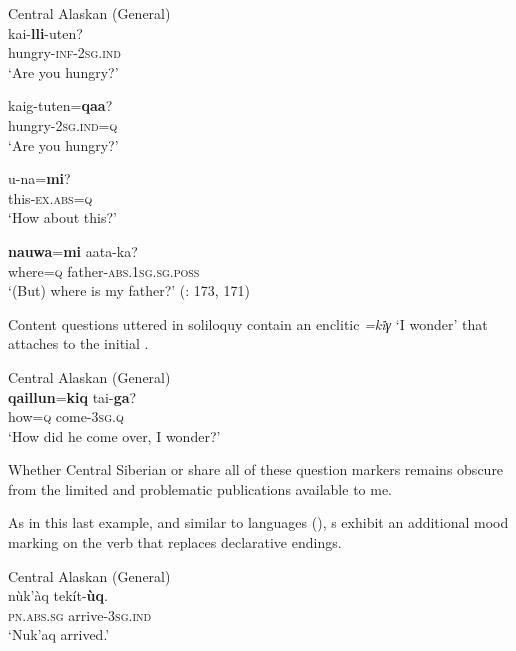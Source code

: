 \ea%
    \label{ex:eska:8}
    Central Alaskan  (General)\\
    \ea
    \gll kai-\textbf{{lli}}-uten?\\
    hungry-\textsc{inf}-2\textsc{sg}.\textsc{ind}\\
    \glt ‘Are you hungry?’
    
    \ex
    \gll kaig-tuten=\textbf{{qaa}}?\\
    hungry-2\textsc{sg}.\textsc{ind}=\textsc{q}\\
    \glt ‘Are you hungry?’
    
    \ex
    \gll u-na=\textbf{{mi}}?\\
    this-\textsc{ex.abs}=\textsc{q}\\
    \glt ‘How about this?’
    
    \ex
    \gll \textbf{{nauwa}}=\textbf{{mi}} aata-ka?\\
    where=\textsc{q}  father-\textsc{abs}.1\textsc{sg.sg.poss}\\
    \glt ‘(But) where is my father?’ (\citealt{Miyaoka2012}: 173, 171)
    \z
    \z

Content questions uttered in soliloquy contain an enclitic \textit{=ki{̇γ}} ‘I wonder’ that attaches to the initial .

\ea%
    \label{ex:eska:9}
    Central Alaskan  (General)\\
    \gll \textbf{{qaillun}}=\textbf{{kiq}} tai-\textbf{{ga}}?\\
    how=\textsc{q}    come-3\textsc{sg}.\textsc{q}\\
    \glt ‘How did he come over, I wonder?’ \citep[1360]{Miyaoka2012}
    \z

\noindent Whether Central Siberian  or   share all of these question markers remains obscure from the limited and problematic publications available to me.

As in this last example, and similar to  languages (), s exhibit an additional  mood marking on the verb that replaces declarative endings.

\ea%
    \label{ex:eska:10}
    Central Alaskan  (General)\\
    \ea
    \gll nùk’àq    tekít-\textbf{{ùq}}.\\
    \textsc{pn.abs.sg}  arrive-3\textsc{sg.ind}\\
    \glt ‘Nuk’aq arrived.’
    
